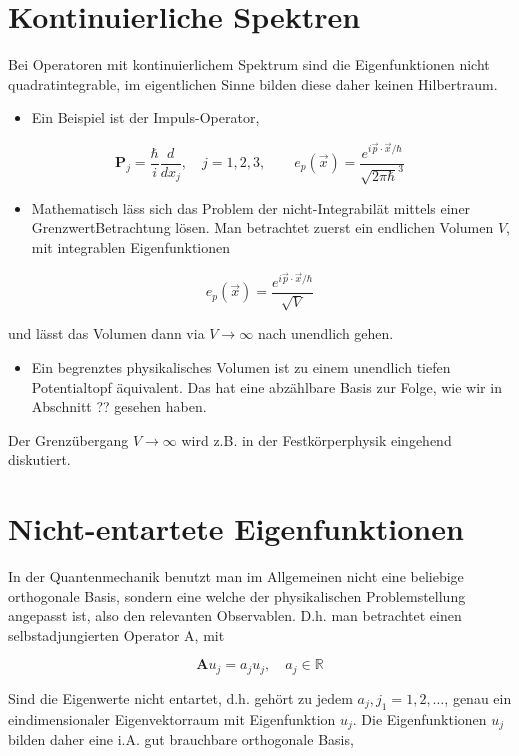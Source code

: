 \documentclass[10pt, letterpaper]{article}
\begin{document}
\section*{Kontinuierliche Spektren}
Bei Operatoren mit kontinuierlichem Spektrum sind die Eigenfunktionen nicht quadratintegrable, im eigentlichen Sinne bilden diese daher keinen Hilbertraum.

\begin{itemize}
  \item Ein Beispiel ist der Impuls-Operator,
\end{itemize}

$$
\mathbf{P}_{j}=\frac{\hbar}{i} \frac{d}{d x_{j}}, \quad j=1,2,3, \quad \quad e_{p}(\vec{x})=\frac{e^{i \vec{p} \cdot \vec{x} / \hbar}}{\sqrt{2 \pi \hbar}^{3}}
$$

\begin{itemize}
  \item Mathematisch läss sich das Problem der nicht-Integrabilät mittels einer GrenzwertBetrachtung lösen. Man betrachtet zuerst ein endlichen Volumen $V$, mit integrablen Eigenfunktionen
\end{itemize}

$$
e_{p}(\vec{x})=\frac{e^{i \vec{p} \cdot \vec{x} / \hbar}}{\sqrt{V}}
$$

und lässt das Volumen dann via $V \rightarrow \infty$ nach unendlich gehen.

\begin{itemize}
  \item Ein begrenztes physikalisches Volumen ist zu einem unendlich tiefen Potentialtopf äquivalent. Das hat eine abzählbare Basis zur Folge, wie wir in Abschnitt ?? gesehen haben.
\end{itemize}

Der Grenzübergang $V \rightarrow \infty$ wird z.B. in der Festkörperphysik eingehend diskutiert.

\section*{Nicht-entartete Eigenfunktionen}
In der Quantenmechanik benutzt man im Allgemeinen nicht eine beliebige orthogonale Basis, sondern eine welche der physikalischen Problemstellung angepasst ist, also den relevanten Observablen. D.h. man betrachtet einen selbstadjungierten Operator A, mit

$$
\mathbf{A} u_{j}=a_{j} u_{j}, \quad a_{j} \in \mathbb{R}
$$

Sind die Eigenwerte nicht entartet, d.h. gehört zu jedem $a_{j}, j_{1}=1,2, \ldots$, genau ein eindimensionaler Eigenvektorraum mit Eigenfunktion $u_{j}$. Die Eigenfunktionen $u_{j}$ bilden daher eine i.A. gut brauchbare orthogonale Basis,
\end{document}
